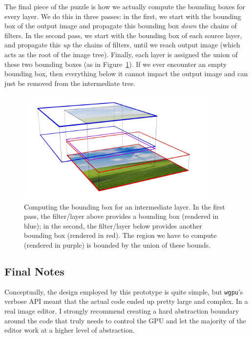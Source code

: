 \documentclass[12pt]{article}
\begin{document}
The final piece of the puzzle is how we actually compute the bounding boxes for every layer.  We do
this in three passes: in the first, we start with the bounding box of the output image and propagate
this bounding box \emph{down} the chains of filters.  In the second pass, we start with the bounding box of
each source layer, and propagate this \emph{up} the chains of filters, until we reach output image
(which acts as the root of the image tree).  Finally, each layer is assigned the union of these two
bounding boxes (as in Figure~\ref{fig:bbox-compute}).  If we ever encounter an empty bounding box,
then everything below it cannot impact the output image and can just be removed from the
intermediate tree.

\begin{figure}
    \begin{center}
        \includegraphics[width=0.9\textwidth]{bbox-compute}
    \end{center}
    \caption{Computing the bounding box for an intermediate layer.  In the first pass, the
    filter/layer above provides a bounding box (rendered in {\color{blue} blue}); in the second, the
    filter/layer below provides another bounding box (rendered in {\color{red} red}).  The region we
    have to compute (rendered in {\color{violet} purple}) is bounded by the union of these
    bounds.}\label{fig:bbox-compute}
\end{figure}

\subsection{Final Notes}

Conceptually, the design employed by this prototype is quite simple, but \verb|wgpu|'s verbose API
meant that the actual code ended up pretty large and complex.  In a real image editor, I strongly
recommend creating a hard abstraction boundary around the code that truly needs to control the GPU
and let the majority of the editor work at a higher level of abstraction.
\end{document}
